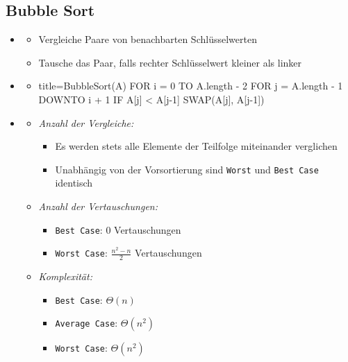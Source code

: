 \documentclass[
    12pt,
    a4paper,
    ngerman,
    color=3b,%
    marginpar=false,
    colorback=false,
    leqno,
]{tudaexercise}
\begin{document}
\subsection{Bubble Sort}\label{BubbleSort}
\begin{itemize}
    \item {}
          \begin{itemize}
              \item Vergleiche Paare von benachbarten Schlüsselwerten
              \item Tausche das Paar, falls rechter Schlüsselwert kleiner als linker
          \end{itemize}

    \item {}
          \begin{itemize}
              \item[]
                    \begin{ccode}[autogobble]{title=BubbleSort(A)}
                        FOR i = 0 TO A.length - 2
                            FOR j = A.length - 1 DOWNTO i + 1
                                IF A[j] < A[j-1]
                                    SWAP(A[j], A[j-1])
                    \end{ccode}
          \end{itemize}

    \item {}
          \begin{itemize}
              \item \textit{Anzahl der Vergleiche:}
                    \begin{itemize}
                        \item Es werden stets alle Elemente der Teilfolge miteinander verglichen
                        \item Unabhängig von der Vorsortierung sind \texttt{Worst} und \texttt{Best Case} identisch
                    \end{itemize}

              \item \textit{Anzahl der Vertauschungen:}
                    \begin{itemize}
                        \item \texttt{Best Case}: 0 Vertauschungen
                        \item \texttt{Worst Case}: $\frac{n^2-n}{2}$ Vertauschungen
                    \end{itemize}

              \item \textit{Komplexität:}
                    \begin{itemize}
                        \item \texttt{Best Case}: $\Theta(n)$
                        \item \texttt{Average Case}: $\Theta(n^2)$
                        \item \texttt{Worst Case}: $\Theta(n^2)$
                    \end{itemize}
          \end{itemize}

\end{itemize}
\end{document}
